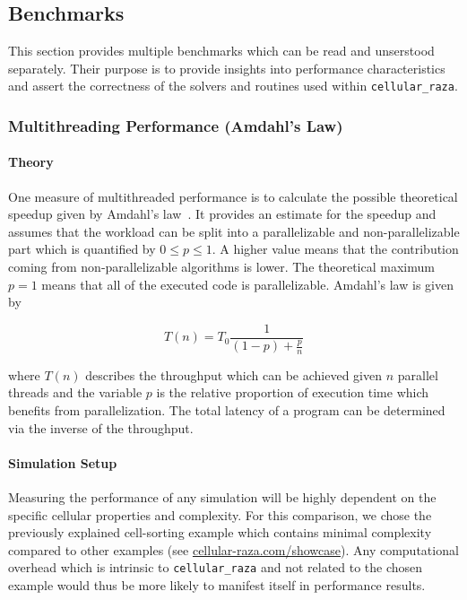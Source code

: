 \documentclass[a4paper]{article}
\begin{document}
\subsection{Benchmarks}
This section provides multiple benchmarks which can be read and unserstood separately.
Their purpose is to provide insights into performance characteristics and assert the correctness of
the solvers and routines used within \texttt{cellular\_raza}.

\subsubsection{Multithreading Performance (Amdahl's Law)}

\paragraph{Theory}
One measure of multithreaded performance is to calculate the possible theoretical speedup
given by Amdahl's law~\cite{Rodgers1985}.
It provides an estimate for the speedup and assumes that the workload can be split into a
parallelizable and non-parallelizable part which is quantified by $0\leq p \leq1$.
A higher value means that the contribution coming from non-parallelizable algorithms is lower.
The theoretical maximum $p=1$ means that all of the executed code is parallelizable.
Amdahl's law is given by

\begin{equation}
    T(n) = T_0\frac{1}{(1-p) + \frac{p}{n}}
    \label{eq:amdahls-law}
\end{equation}

where $T(n)$ describes the throughput which can be achieved given $n$ parallel threads and the
variable $p$ is the relative proportion of execution time which benefits from parallelization.
The total latency of a program can be determined via the inverse of the throughput.

\paragraph{Simulation Setup}
Measuring the performance of any simulation will be highly dependent on the specific cellular 
properties and complexity.
For this comparison, we chose the previously explained cell-sorting example which contains minimal
complexity compared to other examples (see
\href{https://cellular-raza.com/showcase}{cellular-raza.com/showcase}).
Any computational overhead which is intrinsic to \texttt{cellular\_raza} and not related to the
chosen example would thus be more likely to manifest itself in performance results.
\end{document}
